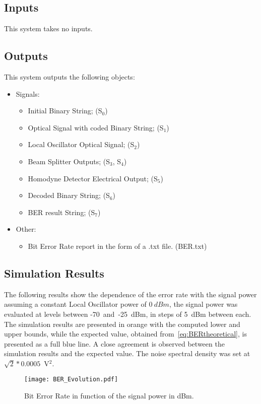 \subsection*{Inputs}

This system takes no inputs.

\subsection*{Outputs}

This system outputs the following objects:
\begin{itemize}
\item Signals:
\begin{itemize}
\item Initial Binary String; (S$_0$)
\item Optical Signal with coded Binary String; (S$_{1}$)
\item Local Oscillator Optical Signal; (S$_{2}$)
\item Beam Splitter Outputs; (S$_{3}$, S$_{4}$)
\item Homodyne Detector Electrical Output; (S$_{5}$)
\item Decoded Binary String; (S$_{6}$)
\item BER result String; (S$_{7}$)
\end{itemize}
\item Other:
\begin{itemize}
\item Bit Error Rate report in the form of a .txt file. (BER.txt)
\end{itemize}
\end{itemize}

\subsection*{Simulation Results}

The following results show the dependence of the error rate with the signal power assuming a constant Local Oscillator power of $0~dBm$, the signal power was evaluated at levels between -70~and~-25~dBm, in steps of 5~dBm between each. The simulation results are presented in orange with the computed lower and upper bounds, while the expected value, obtained from~\eqref{eq:BERtheoretical}, is presented as a full blue line. A close agreement is observed between the simulation results and the expected value. The noise spectral density was set at $\sqrt{2}*0.0005$~V$^2$. 
\begin{figure}[H]
\centering
\texttt{[image: BER\_Evolution.pdf]}
\caption{Bit Error Rate in function of the signal power in dBm.}
\label{fig:berevolution}
\end{figure}

